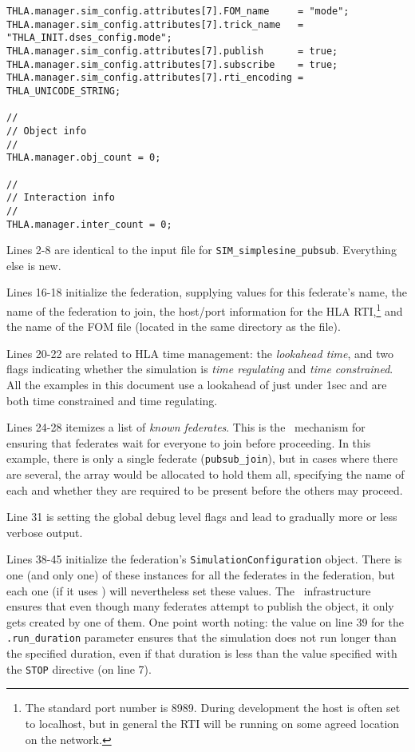 \begin{lstlisting}[caption={{\tt SIM\_simplesine\_hla\_join} input file},label={list:SIM-simplesine-hla-join-input}]
THLA.manager.sim_config.attributes[7].FOM_name     = "mode";
THLA.manager.sim_config.attributes[7].trick_name   = "THLA_INIT.dses_config.mode";
THLA.manager.sim_config.attributes[7].publish      = true;
THLA.manager.sim_config.attributes[7].subscribe    = true;
THLA.manager.sim_config.attributes[7].rti_encoding = THLA_UNICODE_STRING;

//
// Object info
//
THLA.manager.obj_count = 0;

//
// Interaction info
//
THLA.manager.inter_count = 0;
\end{lstlisting}

Lines 2-8 are identical to the input file for {\tt SIM\_simplesine\_pubsub}.
Everything else is new.

Lines 16-18 initialize the federation, supplying values for this federate's
name, the name of the federation to join, the host/port information for the
HLA RTI,\footnote{
  The standard port number is 8989.
  During development the host is often set to localhost, but in general
  the RTI will be running on some agreed location on the network.
}
and the name of the FOM file (located in the same directory as the
\sdefine file).

Lines 20-22 are related to HLA time management: the {\em lookahead time},
and two flags indicating whether the simulation is {\em time regulating}
and {\em time constrained}.
All the examples in this document use a lookahead of just under 1sec
and are both time constrained and time regulating.

Lines 24-28 itemizes a list of {\em known federates}.
This is the \TrickHLA\ mechanism for ensuring that federates wait for
everyone to join before proceeding.
In this example, there is only a single federate ({\tt pubsub\_join}),
but in cases where there are several, the array would be allocated
to hold them all, specifying the name of each and whether they are
required to be present before the others may proceed.

Line 31 is setting the global debug level flags and lead to gradually more or less verbose output.

Lines 38-45 initialize the federation's {\tt SimulationConfiguration} object.
There is one (and only one) of these instances for all the
federates in the federation, but each one (if it uses \TrickHLA)
will nevertheless set these values.
The \TrickHLA\ infrastructure ensures that even though many federates
attempt to publish the object, it only gets created by one of them.
One point worth noting: the value on line 39 for the
{\tt .run\_duration} parameter ensures that the simulation does not run
longer than the specified duration, even if that duration is less than
the value specified with the {\tt STOP} directive (on line 7).

